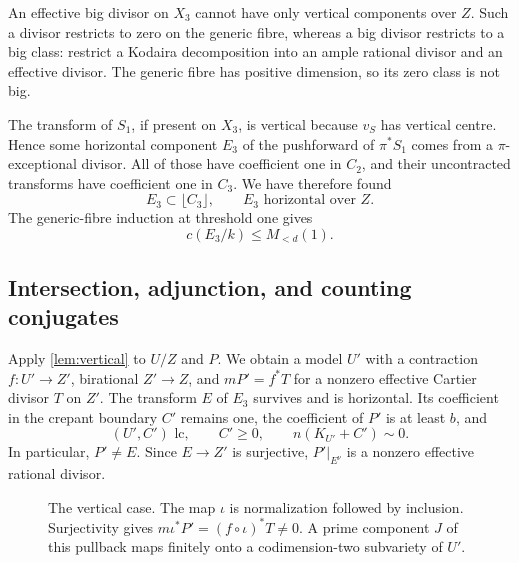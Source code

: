 \documentclass[11pt]{article}
\numberwithin{equation}{section}
\theoremstyle{definition}
\newcommand{\cdeg}[2]{c(#1/#2)}
\begin{document}
An effective big divisor on $X_3$ cannot have only vertical
components over $Z$. Such a divisor restricts to zero on the generic
fibre, whereas a big divisor restricts to a big class: restrict a
Kodaira decomposition into an ample rational divisor and an
effective divisor. The generic fibre has positive dimension, so
its zero class is not big.

The transform of $S_1$, if present on $X_3$, is vertical because
$v_S$ has vertical centre. Hence some horizontal component $E_3$
of the pushforward of $\pi^*S_1$ comes from a $\pi$-exceptional
divisor. All of those have coefficient one in $C_2$, and their
uncontracted transforms have coefficient one in $C_3$. We have
therefore found
\begin{equation}\label{eq:horizontal-floor}
 E_3\subset\lfloor C_3\rfloor,
 \qquad E_3\text{ horizontal over }Z.
\end{equation}
The generic-fibre induction at threshold one gives
\begin{equation}\label{eq:Ebound}
 \cdeg{E_3}{k}\leq M_{<d}(1).
\end{equation}

\subsection{Intersection, adjunction, and counting conjugates}

Apply \cref{lem:vertical} to $U/Z$ and $P$. We obtain a model $U'$
with a contraction $f:U'\to Z'$, birational $Z'\to Z$, and
$mP'=f^*T$ for a nonzero effective Cartier divisor $T$ on $Z'$.
The transform $E$ of $E_3$ survives and is horizontal. Its
coefficient in the crepant boundary $C'$ remains one, the
coefficient of $P'$ is at least $b$, and
\[
 (U',C')\text{ lc},\qquad C'\geq0,
 \qquad n(K_{U'}+C')\sim0.
\]
In particular, $P'\ne E$. Since $E\to Z'$ is surjective,
$P'|_{E^\nu}$ is a nonzero effective rational divisor.

\begin{figure}[ht]
\centering
{}
\caption{The vertical case. The map $\iota$ is normalization followed
by inclusion. Surjectivity gives
$m\iota^*P'=(f\circ\iota)^*T\ne0$.
A prime component $J$ of this pullback maps finitely onto a
codimension-two subvariety of $U'$.}
\label{fig:vertical}
\end{figure}
\end{document}
